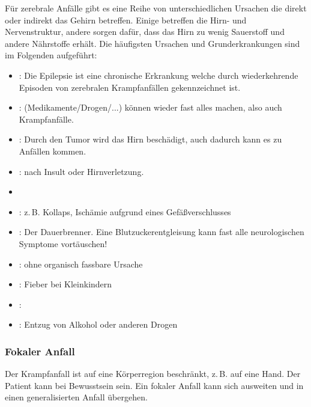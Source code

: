 {%
Für zerebrale Anfälle gibt es eine Reihe von
unterschiedlichen Ursachen die direkt oder indirekt das
Gehirn betreffen. Einige betreffen die Hirn- und
Nervenstruktur, andere sorgen dafür, dass das Hirn zu wenig
Sauerstoff und andere Nährstoffe erhält. Die häufigsten
Ursachen und Grunderkrankungen sind im Folgenden aufgeführt:

\begin{itemize}
  \item {}: Die Epilepsie ist eine chronische
  Erkrankung welche durch wiederkehrende Episoden von zerebralen Krampfanfällen gekennzeichnet ist.
  \item {}: (Medikamente/Drogen/...) können
  wieder fast alles machen, also auch Krampfanfälle. \citep{Supady2009}
  \item {}: Durch den Tumor wird das Hirn
  beschädigt, auch dadurch kann es zu Anfällen kommen.
  \item {}: nach Insult oder Hirnverletzung.
  \item {}
  \item {}: z.\,B. Kollaps, Ischämie
  aufgrund eines Gefäßverschlusses
  \item {}: Der Dauerbrenner.
  Eine Blutzuckerentgleisung kann fast alle neurologischen Symptome vortäuschen!
  \item {}: ohne organisch fassbare  Ursache
  \item {}: Fieber bei Kleinkindern
  \item {}:
  \item {}: Entzug von Alkohol oder anderen Drogen
\end{itemize}
}{
}{}{}{}






\subsubsection{Fokaler Anfall}
\label{topic:krampfanfall-fokaler}
Der Krampfanfall ist auf eine Körperregion beschränkt,
z.\,B. auf eine Hand. Der Patient kann bei Bewusstsein sein.
Ein fokaler Anfall kann sich ausweiten und in einen
generalisierten Anfall übergehen.

      


